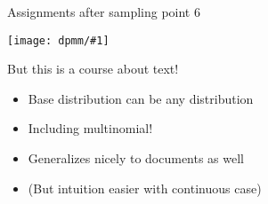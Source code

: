 \documentclass[compress]{beamer}
\newcommand{\gfx}[2]{
\begin{center}
	\texttt{[image: dpmm/\#1]}
\end{center}
}
\begin{document}
\begin{frame}{Assignments after sampling point 6}
    \gfx{dpmm7}{.8}
    \end{frame}



\begin{frame}{But this is a course about text!}

\begin{itemize}
  \item Base distribution can be any distribution
  \item Including multinomial!
  \item Generalizes nicely to documents as well
  \item (But intuition easier with continuous case)
\end{itemize}

\end{frame}
\end{document}
